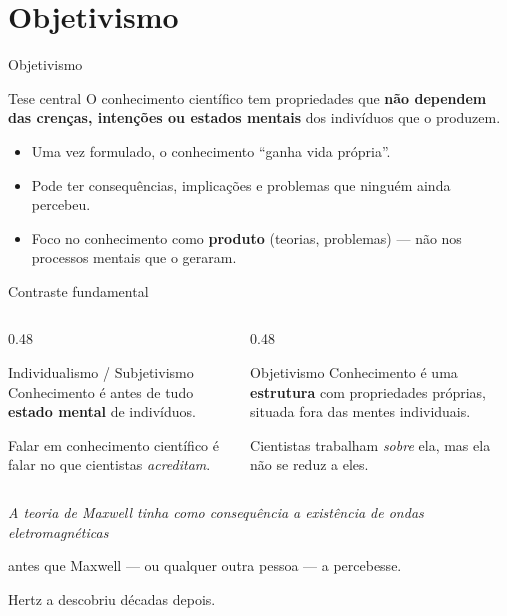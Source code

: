 \documentclass[aspectratio=169]{beamer}
\newcommand{\impt}[1]{\textcolor{maccent}{\textbf{#1}}}
\begin{document}
\section{Objetivismo}

\begin{frame}{Objetivismo}
\begin{block}{Tese central}
O conhecimento cient\'ifico tem propriedades que \impt{n\~ao dependem das cren\c cas, inten\c c\~oes ou estados mentais} dos indiv\'iduos que o produzem.
\end{block}
\vspace{0.3cm}
\begin{itemize}
    \item Uma vez formulado, o conhecimento ``ganha vida pr\'opria''.
    \item Pode ter consequ\^encias, implica\c c\~oes e problemas que ningu\'em ainda percebeu.
    \item Foco no conhecimento como \impt{produto} (teorias, problemas) --- n\~ao nos processos mentais que o geraram.
\end{itemize}
\end{frame}

\begin{frame}{Contraste fundamental}
\begin{columns}[T]
\begin{column}{0.48\textwidth}
\begin{alertblock}{Individualismo / Subjetivismo}
Conhecimento \'e antes de tudo \impt{estado mental} de indiv\'iduos.

\vspace{0.15cm}
Falar em conhecimento cient\'ifico \'e falar no que cientistas \emph{acreditam}.
\end{alertblock}
\end{column}
\begin{column}{0.48\textwidth}
\begin{block}{Objetivismo}
Conhecimento \'e uma \impt{estrutura} com propriedades pr\'oprias, situada fora das mentes individuais.

\vspace{0.15cm}
Cientistas trabalham \emph{sobre} ela, mas ela n\~ao se reduz a eles.
\end{block}
\end{column}
\end{columns}
\vspace{0.5cm}
\begin{center}
\itshape A teoria de Maxwell tinha como consequ\^encia a exist\^encia de ondas eletromagn\'eticas

antes que Maxwell --- ou qualquer outra pessoa --- a percebesse.

Hertz a descobriu d\'ecadas depois.
\end{center}
\end{frame}
\end{document}
